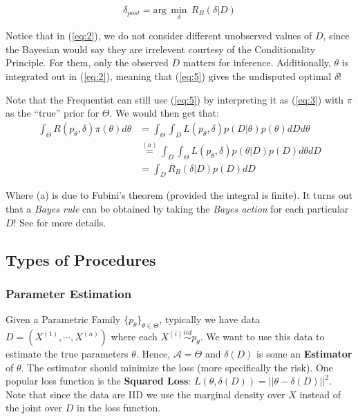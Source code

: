 \documentclass[]{article}
\theoremstyle{mattstyle}
\theoremstyle{definition}
\begin{document}
\begin{equation}\label{eq:5}
\delta_{post}= \text{arg}\,\min\limits_{\delta}\,R_B(\delta|D)
\end{equation}


Notice that in (\ref{eq:2}), we do not consider different unobserved values of \(D\), since the Bayesian would say they are irrelevent courtesy of the Conditionality Principle. For them, only the observed $D$ matters for inference. 
Additionally, \(\theta\) is integrated out in (\ref{eq:2}), meaning that (\ref{eq:5}) gives the undisputed optimal \(\delta\)! 

Note that the Frequentist can still use (\ref{eq:5}) by interpreting it as (\ref{eq:3}) with \(\pi\) as the ``true'' prior for \(\Theta\).
We would then get that:
\begin{align*}
 \int_{\Theta}^{}R(p_\theta,\delta)\pi(\theta)d\theta &= \int_{\Theta}^{}\int_{D}L(p_\theta,\delta)p(D|\theta)p(\theta)dDd\theta \\&\overset{(a)}{=} \int_{D}^{}\int_{\Theta}L(p_\theta,\delta)p(\theta|D)p(D)d\theta dD\\
&=\int_{D}^{}R_B(\delta|D)p(D)dD
\end{align*}

Where (a) is due to Fubini's theorem (provided the integral is finite).
It turns out that a \emph{Bayes rule} can be obtained by taking the \emph{Bayes action} for each particular $D$! See \cite{PHoffNotes2} for more details.

\newpage

\subsection{Types of Procedures}

\subsubsection{Parameter Estimation}\label{sec:parest}
Given a Parametric Family $\{p_{\theta}\}_{\theta\in\Theta}$, typically we have data \(D=(X^{(1)}, \cdots, X^{(n)})\) where each \(X^{(i)}\overset{iid}{\sim} p_{\theta}\). We want to use this data to estimate the true parameters \(\theta\). Hence, \(\mathcal{A} = \Theta\) and $\delta(D)$ is some an \textbf{Estimator} of \(\theta\). The estimator should minimize the loss (more specifically the risk). One popular loss function is the \textbf{Squared Loss}: \(L(\theta,\delta(D)) = ||\theta-\delta(D)||^2\). Note that since the data are IID we use the marginal density over $X$ instead of the joint over $D$ in the loss function.
\end{document}
